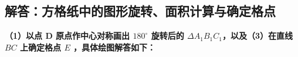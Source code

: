 ﻿%

\subsection{解答：方格纸中的图形旋转、面积计算与确定格点}

\vspace{0.6cm}

\textbf{（1）以点 D 原点作中心对称画出 $180^\circ$ 旋转后的 $\Delta A_1B_1C_1$，以及（3）在直线 $BC$ 上确定格点 $E$ ，具体绘图解答如下：}

\vspace{0.4cm}

